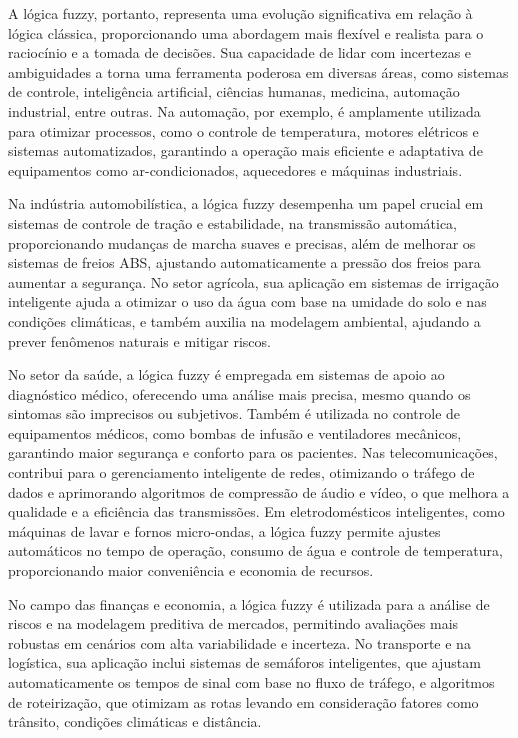 \documentclass[12pt]{article}
\begin{document}
A lógica fuzzy, portanto, representa uma evolução significativa em relação à lógica clássica, proporcionando uma abordagem mais flexível e realista para o raciocínio e a tomada de decisões. Sua capacidade de lidar com incertezas e ambiguidades a torna uma ferramenta poderosa em diversas áreas, como sistemas de controle, inteligência artificial, ciências humanas, medicina, automação industrial, entre outras. Na automação, por exemplo, é amplamente utilizada para otimizar processos, como o controle de temperatura, motores elétricos e sistemas automatizados, garantindo a operação mais eficiente e adaptativa de equipamentos como ar-condicionados, aquecedores e máquinas industriais.

Na indústria automobilística, a lógica fuzzy desempenha um papel crucial em sistemas de controle de tração e estabilidade, na transmissão automática, proporcionando mudanças de marcha suaves e precisas, além de melhorar os sistemas de freios ABS, ajustando automaticamente a pressão dos freios para aumentar a segurança. No setor agrícola, sua aplicação em sistemas de irrigação inteligente ajuda a otimizar o uso da água com base na umidade do solo e nas condições climáticas, e também auxilia na modelagem ambiental, ajudando a prever fenômenos naturais e mitigar riscos.

No setor da saúde, a lógica fuzzy é empregada em sistemas de apoio ao diagnóstico médico, oferecendo uma análise mais precisa, mesmo quando os sintomas são imprecisos ou subjetivos. Também é utilizada no controle de equipamentos médicos, como bombas de infusão e ventiladores mecânicos, garantindo maior segurança e conforto para os pacientes. Nas telecomunicações, contribui para o gerenciamento inteligente de redes, otimizando o tráfego de dados e aprimorando algoritmos de compressão de áudio e vídeo, o que melhora a qualidade e a eficiência das transmissões. Em eletrodomésticos inteligentes, como máquinas de lavar e fornos micro-ondas, a lógica fuzzy permite ajustes automáticos no tempo de operação, consumo de água e controle de temperatura, proporcionando maior conveniência e economia de recursos.

No campo das finanças e economia, a lógica fuzzy é utilizada para a análise de riscos e na modelagem preditiva de mercados, permitindo avaliações mais robustas em cenários com alta variabilidade e incerteza. No transporte e na logística, sua aplicação inclui sistemas de semáforos inteligentes, que ajustam automaticamente os tempos de sinal com base no fluxo de tráfego, e algoritmos de roteirização, que otimizam as rotas levando em consideração fatores como trânsito, condições climáticas e distância.
\end{document}
